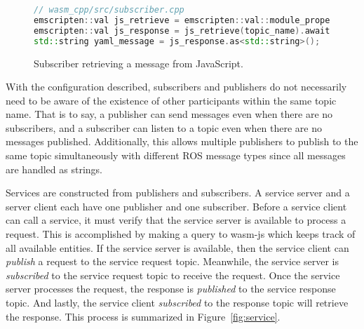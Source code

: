     \begin{figure}[htbp]
        \centering
        \begin{lstlisting}[language=C++]
// wasm_cpp/src/subscriber.cpp
emscripten::val js_retrieve = emscripten::val::module_property("retrieveMessage");
emscripten::val js_response = js_retrieve(topic_name).await();
std::string yaml_message = js_response.as<std::string>();
\end{lstlisting}    
        \caption{Subscriber retrieving a message from JavaScript.}
        \label{fig:retrieve}
    \end{figure}

    With the configuration described, subscribers and publishers do not necessarily need to be aware of the existence of other participants within the same topic name. That is to say, a publisher can send messages even when there are no subscribers, and a subscriber can listen to a topic even when there are no messages published. Additionally, this allows multiple publishers to publish to the same topic simultaneously with different \ac{ROS} message types since all messages are handled as strings.

    Services are constructed from publishers and subscribers. A service server and a server client each have one publisher and one subscriber. Before a service client can call a service, it must verify that the service server is available to process a request. This is accomplished by making a query to \textsf{wasm-js} which keeps track of all available entities. If the service server is available, then the service client can \textit{publish} a request to the service request topic. Meanwhile, the service server is \textit{subscribed} to the service request topic to receive the request. Once the service server processes the request, the response is \textit{published} to the service response topic. And lastly, the service client \textit{subscribed} to the response topic will retrieve the response. This process is summarized in Figure~\ref{fig:service}.

